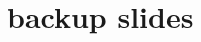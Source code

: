 \documentclass[aspectratio=169]{mytalk}
\title{}
\date{}
\begin{document}




\begin{frame}{}
\end{frame}

\section{backup slides}


\end{document}
